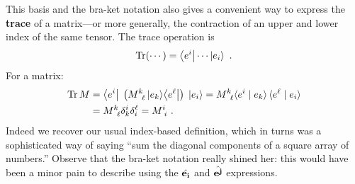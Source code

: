 \documentclass[12pt, oneside]{report}    %
\begin{document}
This basis and the bra-ket notation also gives a convenient way to express the \textbf{trace} of a matrix---or more generally, the contraction of an upper and lower index of the same tensor. The trace operation is
\begin{align}
    \operatorname{\textnormal{Tr}}(\cdots) = 
    \left\langle e^i\right| \cdots \left|e_i\right\rangle \ .
\end{align}
For a matrix:
\begin{align}
    \Tr M &= \bra{e^i}\; \left(M\aij{k}{\ell}\ket{e_k}\!\bra{e^\ell}\right) \;\ket{e_i}
    = M\aij{k}{\ell}  
    \la {e^i} \mid {e_k}\ra \, \la {e^\ell} \mid {e_i} \ra 
    \\
    &= 
    M\aij{k}{\ell}  \delta^i_k \delta^\ell_i 
    =  M\aij{i}{i} \ .
\end{align}
Indeed we recover our usual index-based definition, which in turns was a sophisticated way of saying ``sum the diagonal components of a square array of numbers.'' Observe that the bra-ket notation really shined her: this would have been a minor pain to describe using the $\hat{\mathbf{e_i}}$ and $\hat{\mathbf{e^j}}$ expressions.
\end{document}
